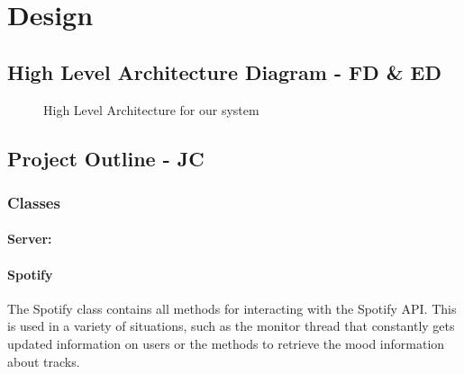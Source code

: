 \documentclass[10pt, notitlepage]{report}
\begin{document}
\chapter{Design}

\section{High Level Architecture Diagram - FD \& ED}

\begin{figure}[h]
	\centering
	\caption{High Level Architecture for our system}
	\label{fig:hla}
\end{figure}

\section{Project Outline - JC}

\subsection{Classes}


\subsubsection{Server:}

\hrulefill

\subsubsection{Spotify}
The Spotify class contains all methods for interacting with the Spotify API. This is used in a variety of situations, such as the monitor thread that constantly gets updated information on users or the methods to retrieve the mood information about tracks. 
\end{document}
